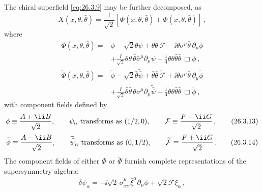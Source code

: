 The chiral superfield \eqref{eq:26.3.9} may be further decomposed, as
\begin{equation}
  X(x,\theta,\bar\theta)=\frac{1}{\sqrt{2}}
  \left[\Phi(x,\theta,\bar\theta)
  +\widetilde{\Phi}(x,\theta,\bar\theta)\right]\,,
  \tag{26.3.10}\label{eq:26.3.10}
\end{equation}
where
\begin{equation}
  \begin{aligned}
  \Phi(x,\theta,\bar\theta)={}&
  \phi-\sqrt{2}\theta\psi+\theta\theta\,\mathcal F
  -\ii\theta\sigma^\mu\bar\theta\,\partial_\mu\phi\\
  &+\frac{\ii}{\sqrt{2}}\theta\theta\,
    \bar\theta\bar\sigma^\mu\partial_\mu\psi
  +\frac14\theta\theta\bar\theta\bar\theta\,\Box\phi\,,
  \end{aligned}
  \tag{26.3.11}\label{eq:26.3.11}
\end{equation}
\begin{equation}
  \begin{aligned}
  \widetilde{\Phi}(x,\theta,\bar\theta)={}&
  \widetilde{\phi}-\sqrt{2}\bar\theta\widetilde{\bar\psi}
  +\bar\theta\bar\theta\,\widetilde{\mathcal F}
  +\ii\theta\sigma^\mu\bar\theta\,\partial_\mu\widetilde{\phi}\\
  &+\frac{\ii}{\sqrt{2}}\bar\theta\bar\theta\,
    \theta\sigma^\mu\partial_\mu\widetilde{\bar\psi}
  +\frac14\theta\theta\bar\theta\bar\theta
    \,\Box\widetilde{\phi}\,,
  \end{aligned}
  \tag{26.3.12}\label{eq:26.3.12}
\end{equation}
with component fields defined by
\begin{equation}
  \phi\equiv\frac{A+\ii B}{\sqrt{2}},\qquad
  \psi_\alpha\ \hbox{transforms as }(1/2,0),\qquad
  \mathcal{F}\equiv\frac{F-\ii G}{\sqrt{2}}\,,
  \tag{26.3.13}\label{eq:26.3.13}
\end{equation}
\begin{equation}
  \widetilde{\phi}\equiv\frac{A-\ii B}{\sqrt{2}},\qquad
  \widetilde{\bar\psi}_{\dot\alpha}\ \hbox{transforms as }(0,1/2),
  \qquad
  \widetilde{\mathcal{F}}\equiv\frac{F+\ii G}{\sqrt{2}}\,.
  \tag{26.3.14}\label{eq:26.3.14}
\end{equation}
The component fields of either $\Phi$ or $\widetilde{\Phi}$ furnish complete
representations of the supersymmetry algebra:
\begin{equation}
  \delta\psi_\alpha
  =-\ii\sqrt{2}\,\sigma^\mu_{\alpha\dot\alpha}
    \bar\xi^{\dot\alpha}\partial_\mu\phi
  +\sqrt{2}\mathcal{F}\xi_\alpha\,,
  \tag{26.3.15}\label{eq:26.3.15}
\end{equation}
